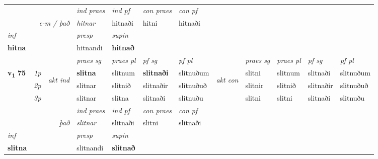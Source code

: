 \begin{longtable}[l]{X>{\footnotesize\itshape}llXXXXlXXXX}
   && &  \textit{ind praes} & \textit{ind pf} & \textit{con praes} & \textit{con pf} \\*
\multicolumn{3}{r}{\textit{e-m / það}} & hitnar & hitnaði & hitni & hitnaði \\*

\cmidrule{4-7}
   {\textit{inf}} & &     & \textit{presp} & \textit{supin}   \\*
  {\textbf{hitna}} & &     & hitnandi &  \textbf{hitnað}   \\*

\midrule

 & &   & \textit{praes sg}  & \textit{praes pl}    & \textit{ pf sg} & \textit{pf pl} & & \textit{praes sg}  & \textit{praes pl}    & \textit{pf sg} & \textit{pf pl }  \\ \cmidrule{4-7} \cmidrule{9-12}
 \multirow{2}{*}{{{\textbf{v{\textsubscript{1}}} \Large{\textbf{75}}}}}  & 1p & \multirow{3}{*}{\begin{turn}{90}\textit{akt ind}\end{turn}} & \textbf{slitna} & slitnum & \textbf{slitnaði} & slitnuðum & \multirow{3}{*}{\begin{turn}{90}\textit{akt con}\end{turn}} &slitni & slitnum & slitnaði & slitnuðum\\*
 & 2p &  &  slitnar  & slitnið & slitnaðir & slitnuðuð & & slitnir & slitnið & slitnaðir & slitnuðuð \\*
 & 3p &  & slitnar & slitna & slitnaði & slitnuðu & & slitni & slitni& slitnaði & slitnuðu \\*
\cmidrule{4-7} \cmidrule{9-12}

   && &  \textit{ind praes} & \textit{ind pf} & \textit{con praes} & \textit{con pf} \\*
\multicolumn{3}{r}{\textit{það}} & slitnar & slitnaði & slitni & slitnaði \\*

\cmidrule{4-7}
   {\textit{inf}} & &     & \textit{presp} & \textit{supin}   \\*
  {\textbf{slitna}} & &     & slitnandi &  \textbf{slitnað}   \\*

\midrule


\end{longtable}
